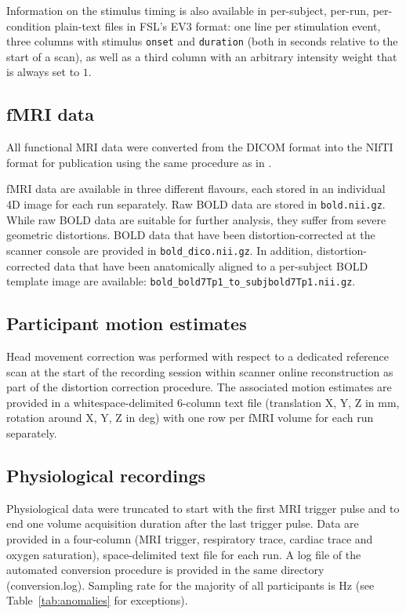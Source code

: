 \documentclass[10pt,a4paper,twocolumn]{article}
\begin{document}
Information on the stimulus timing is also available in per-subject, per-run,
per-condition plain-text files in FSL's EV3 format: one line per stimulation
event, three columns with stimulus \texttt{onset} and \texttt{duration} (both
in seconds relative to the start of a scan), as well as a third column with an
arbitrary intensity weight that is always set to $1$.

\subsection*{fMRI data}

All functional MRI data were converted from the DICOM format into the NIfTI
format for publication using the same procedure as in \cite{HBI+14}.

fMRI data are available in three different flavours, each stored in an
individual 4D image for each run separately. Raw BOLD data are stored in
\texttt{bold.nii.gz}. While raw BOLD data are suitable for further analysis,
they suffer from severe geometric distortions. BOLD data that have been
distortion-corrected \cite{IS2012} at the scanner console are provided in
\texttt{bold\_dico.nii.gz}. In addition, distortion-corrected data that
have been anatomically aligned to a per-subject  BOLD template image
are available: \texttt{bold\_bold7Tp1\_to\_subjbold7Tp1.nii.gz}.

\subsection*{Participant motion estimates}

Head movement correction was performed with respect to a dedicated reference
scan at the start of the recording session within scanner online reconstruction
as part of the distortion correction procedure. The associated motion estimates
are provided in a whitespace-delimited 6-column text file (translation X, Y, Z
in mm, rotation around X, Y, Z in deg) with one row per fMRI volume for each
run separately.

\subsection*{Physiological recordings}

Physiological data were truncated to start with the first MRI trigger pulse and
to end one volume acquisition duration after the last trigger pulse. Data are
provided in a four-column (MRI trigger, respiratory trace, cardiac trace and
oxygen saturation), space-delimited text file for each run. A log file of the
automated conversion procedure is provided in the same directory
(conversion.log). Sampling rate for the majority of all participants is
\unit[200]{Hz} (see Table~\ref{tab:anomalies} for exceptions). 
\end{document}
